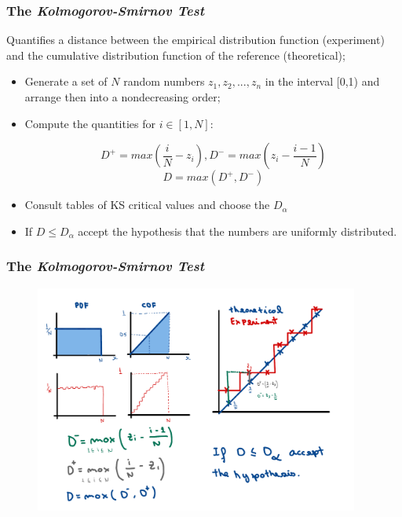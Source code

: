\begin{frame}
    \frametitle{The \textit{Kolmogorov-Smirnov Test}}

    Quantifies a distance between the empirical distribution function (experiment)
    and the cumulative distribution function of the reference (theoretical);
    \begin{itemize}
 
        \item Generate a set of $N$ random numbers $z_1,z_2,...,z_n$ in the interval [0,1)
        and arrange then into a nondecreasing order;

        \item Compute the quantities for $i \in [1,N]$:

        $$D^+=max\left(\frac{i}{N}-z_i\right), D^-=max\left(z_i-\frac{i-1}{N}\right)$$
        $$D=max(D^+,D^-)$$

        \item Consult tables of KS critical values and choose the $D_{\alpha}$
        \item If $D\leq D_{\alpha}$ accept the hypothesis that the numbers are
        uniformly distributed.


    \end{itemize}

\end{frame}

\begin{frame}
    \frametitle{The \textit{Kolmogorov-Smirnov Test}}
    \begin{figure}
        \centering
        \includegraphics[width=0.95\textwidth]{sections/prng/figures/ks_example.pdf}
    \end{figure}
\end{frame}


